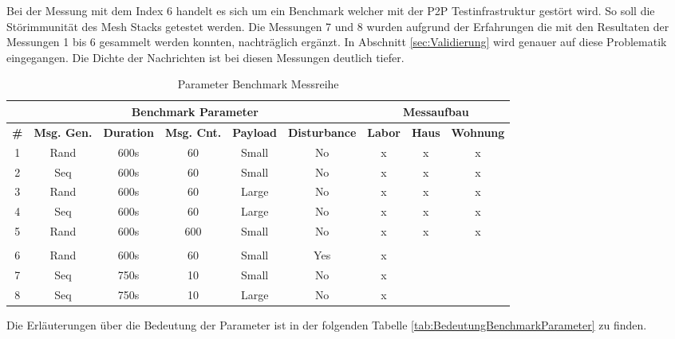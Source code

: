 Bei der Messung mit dem Index 6 handelt es sich um ein Benchmark welcher mit der P2P Testinfrastruktur gestört wird. So soll die Störimmunität des Mesh Stacks getestet werden.
Die Messungen 7 und 8 wurden aufgrund der Erfahrungen die mit den Resultaten der Messungen 1 bis 6 gesammelt werden konnten, nachträglich ergänzt. In Abschnitt \ref{sec:Validierung} wird genauer auf diese Problematik eingegangen.
Die Dichte der Nachrichten ist bei diesen Messungen deutlich tiefer.


\begin{table}[h]
\centering
\begin{adjustbox}{width=1\textwidth}
\begin{tabular}{|c|c|c|c|c|c|c|c|c|} 
\cline{2-9}
\multicolumn{1}{c|}{} & \multicolumn{5}{c|}{Benchmark Parameter} & \multicolumn{3}{c|}{Messaufbau} \\ 
\hline
\textbf{\#}  & \textbf{Msg. Gen.}  & \textbf{Duration} & \textbf{Msg. Cnt.}  & \textbf{Payload }  & \textbf{Disturbance}  & \textbf{Labor}  & \textbf{Haus}  & \textbf{Wohnung}  \\ 
\hline
1 & Rand & 600s & 60 & Small & No & x & x & x \\ 
\hline
2 & Seq & 600s & 60 & Small & No & x & x & x \\ 
\hline
3 & Rand & 600s & 60 & Large & No & x & x & x \\ 
\hline
4 & Seq & 600s & 60 & Large & No & x & x & x \\ 
\hline
5 & Rand & 600s & 600 & Small & No & x & x & x \\ 
\hline
\multicolumn{1}{c}{} & \multicolumn{1}{c}{} & \multicolumn{1}{c}{} & \multicolumn{1}{c}{} & \multicolumn{1}{c}{} & \multicolumn{1}{c}{} & \multicolumn{1}{c}{} & \multicolumn{1}{c}{} & \multicolumn{1}{c}{} \\ 
\hline
6 & Rand & 600s & 60 & Small & Yes & x &  &  \\ 
\hline
7 & Seq & 750s & 10 & Small & No & x &  &  \\ 
\hline
8 & Seq & 750s & 10 & Large & No & x &  &  \\
\hline
\end{tabular}
\end{adjustbox}
\caption{Parameter Benchmark Messreihe}
\label{tab:ParameterBenchmarkMessreihe}
\end{table}

Die Erläuterungen über die Bedeutung der Parameter ist in der folgenden Tabelle \ref{tab:BedeutungBenchmarkParameter} zu finden. 

